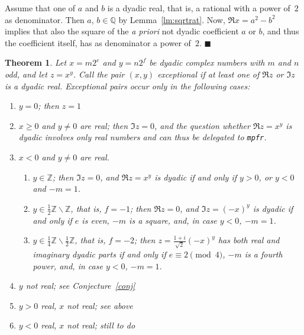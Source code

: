 \documentclass [12pt]{article}
\newcommand {\mpfr}{{\tt mpfr}}
\newcommand {\Z}{\mathbb Z}
\newcommand {\Q}{\mathbb Q}
\renewcommand {\geq}{\geqslant}
\newtheorem{theorem}{Theorem}
\newenvironment{proof}{\noindent{\bf Proof:}}{{\hspace* {\fill}$\blacksquare$}}
\begin{document}
\begin{proof}
Assume that one of $a$ and $b$ is a dyadic real, that is, a rational with
a power of~$2$ as denominator. Then $a$, $b \in \Q$ by Lemma~\ref {lm:sqrtrat}.
Now, $\Re x = a^2 - b^2$ implies that also the square of the \textit {a priori}
not dyadic coefficient $a$ or $b$, and thus the coefficient itself,
has as denominator a power of~$2$.
\end{proof}


\begin {theorem}
Let $x = m 2^e$ and $y = n 2^f$ be dyadic complex numbers with $m$ and $n$ odd,
and let $z = x^y$. Call the pair $(x, y)$ {\em exceptional} if at least
one of $\Re z$ or $\Im z$ is a dyadic real. Exceptional pairs occur
only in the following cases:
\begin {enumerate}
\item
$y = 0$; then $z = 1$
\item
$x \geq 0$ and $y \neq 0$ are real; then $\Im z = 0$, and the question
whether $\Re z = x^y$ is dyadic involves only real numbers and
can thus be delegated to \mpfr.
\item
$x < 0$ and $y \neq 0$ are real.
\begin {enumerate}
\item
$y \in \Z$; then $\Im z = 0$, and $\Re z = x^y$ is dyadic if and only if
$y > 0$, or $y < 0$ and $-m = 1$.
\item
$y \in \frac {1}{2} \Z \backslash \Z$, that is, $f = -1$;
then $\Re z = 0$, and $\Im z = (-x)^y$ is dyadic if and only if
$e$ is even, $-m$ is a square, and, in case $y < 0$, $-m = 1$.
\item
$y \in \frac {1}{4} \Z \backslash \frac {1}{2} \Z$, that is, $f = -2$;
then $z = \frac {1 + i}{\sqrt 2} (-x)^y$ has both real and imaginary
dyadic parts if and only if
$e \equiv 2 \pmod 4$, $-m$ is a fourth power, and, in case $y < 0$, $-m = 1$.
\end {enumerate}
\item
$y$ not real;
see Conjecture~\ref {conj}
\item
$y > 0$ real, $x$ not real;
see above
\item
$y < 0$ real, $x$ not real;
still to do
\end {enumerate}
\end {theorem}
\end{document}
